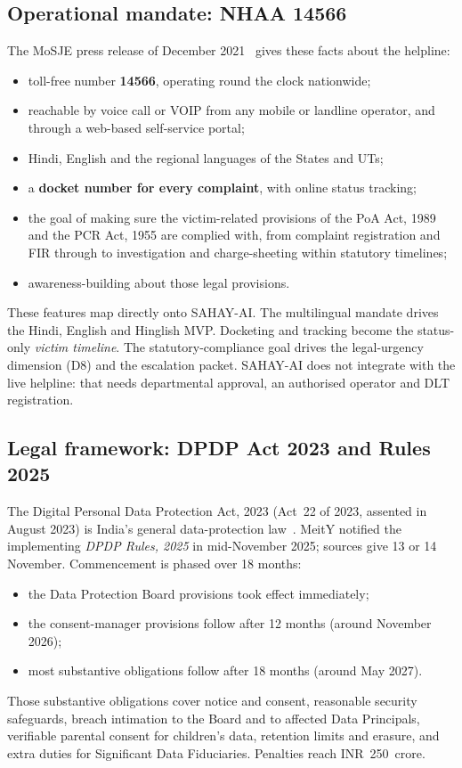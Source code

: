 \documentclass[11pt,a4paper]{article}
\begin{document}
\subsection{Operational mandate: NHAA 14566}
The MoSJE press release of December 2021~\cite{pib2021} gives these facts about the helpline:
\begin{itemize}
  \item toll-free number \textbf{14566}, operating round the clock nationwide;
  \item reachable by voice call or VOIP from any mobile or landline operator, and through a
        web-based self-service portal;
  \item Hindi, English and the regional languages of the States and UTs;
  \item a \textbf{docket number for every complaint}, with online status tracking;
  \item the goal of making sure the victim-related provisions of the PoA Act, 1989 and the PCR Act,
        1955 are complied with, from complaint registration and FIR through to investigation and
        charge-sheeting within statutory timelines;
  \item awareness-building about those legal provisions.
\end{itemize}

\noindent These features map directly onto SAHAY-AI. The multilingual mandate drives the Hindi,
English and Hinglish MVP. Docketing and tracking become the status-only \emph{victim timeline}. The
statutory-compliance goal drives the legal-urgency dimension (D8) and the escalation packet.
SAHAY-AI does not integrate with the live helpline: that needs departmental approval, an authorised
operator and DLT registration.

\subsection{Legal framework: DPDP Act 2023 and Rules 2025}
The Digital Personal Data Protection Act, 2023 (Act~22 of 2023, assented in August 2023) is India's
general data-protection law~\cite{meity2023}. MeitY notified the implementing \emph{DPDP Rules, 2025} in mid-November
2025; sources give 13 or 14 November. Commencement is phased over 18 months:
\begin{itemize}
  \item the Data Protection Board provisions took effect immediately;
  \item the consent-manager provisions follow after 12 months (around November 2026);
  \item most substantive obligations follow after 18 months (around May 2027).
\end{itemize}
Those substantive obligations cover notice and consent, reasonable security safeguards, breach
intimation to the Board and to affected Data Principals, verifiable parental consent for children's
data, retention limits and erasure, and extra duties for Significant Data Fiduciaries. Penalties
reach INR~250~crore.
\end{document}
